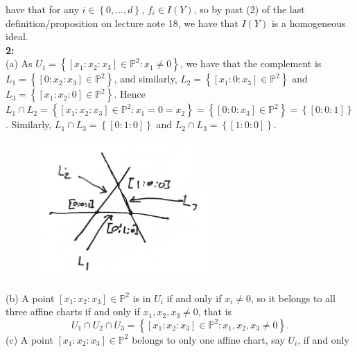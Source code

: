 \documentclass[a4paper]{article}
\begin{document}
    have
    that for any $i \in \left\{ 0, \ldots, d \right\}$, 
    $f_i \in I(Y)$, so by past (2) of the last definition/proposition on lecture note 18,
    we
    have that $I(Y)$ is a homogeneous ideal.\\
    \linebreak
    \textbf{2:}\\
    (a) As  $U_1 = \left\{ \left[ x_1  \colon x_2  \colon x_3 \right] 
    \in \mathbb{P}^2  \colon x_1 \neq 0 \right\} $, we have
    that the complement is
    $L_1 = \left\{ \left[ 0  \colon x_2  \colon x_3 \right] \in \mathbb{P}^2
    \right\} $, and similarly,
    $L_2 = \left\{ \left[ x_1  \colon 0  \colon x_3 \right] \in \mathbb{P}^2 \right\} $ 
    and
    $L_3 = \left\{ \left[ x_1  \colon x_2  \colon 0 \right]  \in \mathbb{P}^2
    \right\} $. 
    Hence $L_1 \cap L_2 = 
    \left\{ \left[ x_1  \colon x_2  \colon x_3 \right] \in \mathbb{P}^2  \colon
    x_1 = 0 = x_2 \right\} =
    \left\{ \left[ 0  \colon 0  \colon x_3 \right] \in \mathbb{P}^2 \right\}
    = \left\{ \left[ 0:0:1 \right]  \right\} 
    $.
    Similarly,
    $L_1 \cap L_3 = \left\{ \left[ 0  \colon 1  \colon 0 \right] 
     \right\} $ and
    $L_2 \cap L_3 = \left\{ \left[ 1  \colon 0  \colon 0 \right]
     \right\} $.\\
     \begin{figure}[H]
         \centering
         \includegraphics[width=0.6\textwidth]{2.jpeg}
         \label{fig:2-jpeg}
     \end{figure}
    (b) A point $\left[ x_1  \colon x_2  \colon x_3 \right] \in \mathbb{P}^2$ 
    is
    in $U_i$ if and only if $x_i \neq 0$, so it belongs to all three affine
    charts if and only if $x_1, x_2, x_3 \neq 0$, that is
    \[
    U_1 \cap U_2 \cap U_3 = \left\{ \left[ x_1  \colon x_2  \colon x_3 \right]
    \in \mathbb{P}^2  \colon x_1, x_2, x_3 \neq 0 \right\} .
    \] 
    (c) A point
    $\left[ x_1  \colon x_2  \colon x_3 \right] \in \mathbb{P}^2$ belongs to only one affine chart, say  $U_i$, if and only
\end{document}
